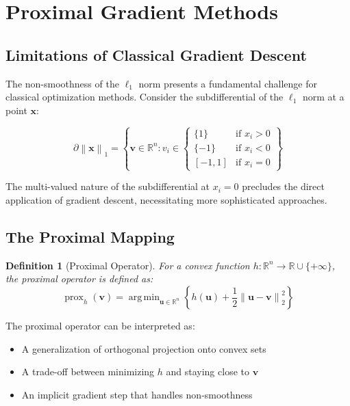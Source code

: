 \documentclass[12pt]{article}
\renewcommand{\vec}[1]{\mathbf{#1}}
\DeclareMathOperator{\prox}{prox}
\DeclareMathOperator{\argmin}{arg\,min}
\newcommand{\norm}[1]{\left\lVert#1\right\rVert}
\newcommand{\R}{\mathbb{R}}
\newtheorem{definition}[theorem]{Definition}
\begin{document}
\newpage
\section{Proximal Gradient Methods}

\subsection{Limitations of Classical Gradient Descent}

The non-smoothness of the $\ell_1$ norm presents a fundamental challenge for classical optimization methods. Consider the subdifferential of the $\ell_1$ norm at a point $\vec{x}$:

\begin{equation}
    \partial\norm{\vec{x}}_1 = \left\{ \vec{v} \in \R^n : v_i \in
    \begin{cases}
        \{1\}   & \text{if } x_i > 0 \\
        \{-1\}  & \text{if } x_i < 0 \\
        [-1, 1] & \text{if } x_i = 0
    \end{cases}
    \right\}
\end{equation}

The multi-valued nature of the subdifferential at $x_i = 0$ precludes the direct application of gradient descent, necessitating more sophisticated approaches.

\subsection{The Proximal Mapping}

\begin{definition}[Proximal Operator]\label{def:prox}
    For a convex function $h: \R^n \to \R \cup \{+\infty\}$, the proximal operator is defined as:
    \begin{equation}\label{eq:prox-def}
        \prox_h(\vec{v}) = \argmin_{\vec{u} \in \R^n} \left\{ h(\vec{u}) + \frac{1}{2}\norm{\vec{u} - \vec{v}}_2^2 \right\}
    \end{equation}
\end{definition}

The proximal operator can be interpreted as:
\begin{itemize}
    \item A generalization of orthogonal projection onto convex sets
    \item A trade-off between minimizing $h$ and staying close to $\vec{v}$
    \item An implicit gradient step that handles non-smoothness
\end{itemize}
\end{document}
